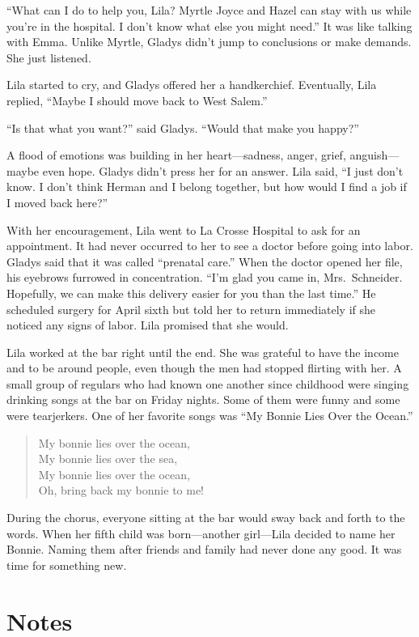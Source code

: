 \documentclass[
  american,
  letterpaper,
]{book}
\begin{document}
``What can I do to help you, Lila? Myrtle Joyce and Hazel can stay with
us while you're in the hospital. I don't know what else you might
need.'' It was like talking with Emma. Unlike Myrtle, Gladys didn't jump
to conclusions or make demands. She just listened.

Lila started to cry, and Gladys offered her a handkerchief. Eventually,
Lila replied, ``Maybe I should move back to West Salem.''

``Is that what you want?'' said Gladys. ``Would that make you happy?''

A flood of emotions was building in her heart---sadness, anger, grief,
anguish---maybe even hope. Gladys didn't press her for an answer. Lila
said, ``I just don't know. I don't think Herman and I belong together,
but how would I find a job if I moved back here?''

With her encouragement, Lila went to La Crosse Hospital to ask for an
appointment. It had never occurred to her to see a doctor before going
into labor. Gladys said that it was called ``prenatal care.'' When the
doctor opened her file, his eyebrows furrowed in concentration. ``I'm
glad you came in, Mrs.~Schneider. Hopefully, we can make this delivery
easier for you than the last time.'' He scheduled surgery for April
sixth but told her to return immediately if she noticed any signs of
labor. Lila promised that she would.

Lila worked at the bar right until the end. She was grateful to have the
income and to be around people, even though the men had stopped flirting
with her. A small group of regulars who had known one another since
childhood were singing drinking songs at the bar on Friday nights. Some
of them were funny and some were tearjerkers. One of her favorite songs
was ``My Bonnie Lies Over the Ocean.''

\begin{quote}
My bonnie lies over the ocean,\\
My bonnie lies over the sea,\\
My bonnie lies over the ocean,\\
Oh, bring back my bonnie to me!
\end{quote}

During the chorus, everyone sitting at the bar would sway back and forth
to the words. When her fifth child was born---another girl---Lila
decided to name her Bonnie. Naming them after friends and family had
never done any good. It was time for something new.

\section{Notes}\label{notes-53}
\end{document}
